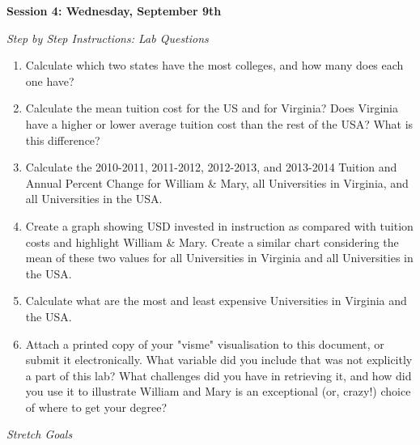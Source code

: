 \documentclass{article}
\newenvironment{Schunk}{}{}
\begin{document}
{\begin{enumerate}[leftmargin=15mm]
\begin{Schunk}
\begin{Sinput}
\end{Sinput}
\end{Schunk}

\end{enumerate}


\setlength{\leftskip}{0cm}
 
\large{\textbf{Session 4: Wednesday, September 9th}}

\vspace{4mm}
\setlength{\leftskip}{1cm}
\textit{Step by Step Instructions: Lab Questions}

\begin{enumerate}[leftmargin=15mm]

\item Calculate which two states have the most colleges, and how many does each one have?

\item Calculate the mean tuition cost for the US and for Virginia?  Does Virginia have a higher or lower average tuition cost than the rest of the USA?  What is this difference?

\item Calculate the 2010-2011, 2011-2012, 2012-2013, and 2013-2014 Tuition and Annual Percent Change for William \& Mary, all Universities in Virginia, and all Universities in the USA.

\item Create a graph showing USD invested in instruction as compared with tuition costs and highlight William \& Mary.  Create a similar chart considering the mean of these two values for all Universities in Virginia and all Universities in the USA.

\item Calculate what are the most and least expensive Universities in Virginia and the USA. 

\item Attach a printed copy of your "visme" visualisation to this document, or submit it electronically.  What variable did you include that was not explicitly a part of this lab?  What challenges did you have in retrieving it, and how did you use it to illustrate William and Mary is an exceptional (or, crazy!) choice of where to get your degree?

\end{enumerate}

\vspace{4mm}
\setlength{\leftskip}{0cm}
\textit{Stretch Goals}

}
\end{document}
